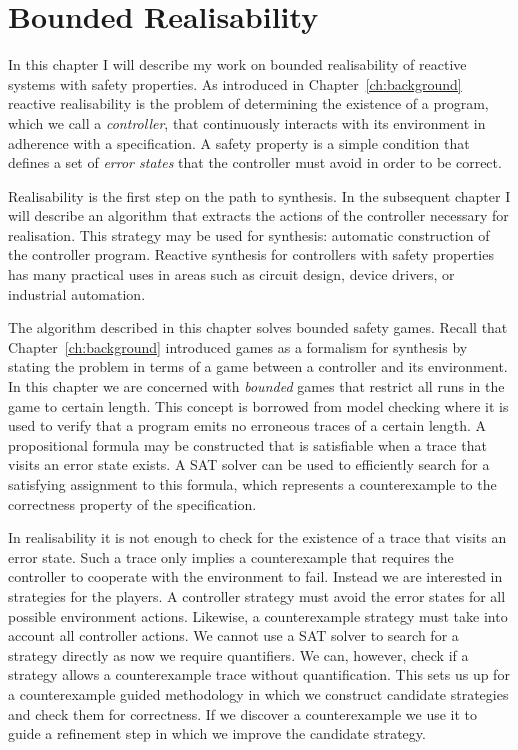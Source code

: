\chapter{Bounded Realisability}
\label{ch:bounded}

\newtheorem*{exmp}{Example}
\newtheorem*{exmpI}{Example: Intuition behind the algorithm}

In this chapter I will describe my work on bounded realisability of reactive systems with safety properties. As introduced in Chapter~\ref{ch:background} reactive realisability is the problem of determining the existence of a program, which we call a \emph{controller}, that continuously interacts with its environment in adherence with a specification. A safety property is a simple condition that defines a set of \emph{error states} that the controller must avoid in order to be correct.

Realisability is the first step on the path to synthesis. In the subsequent chapter I will describe an algorithm that extracts the actions of the controller necessary for realisation. This strategy may be used for synthesis: automatic construction of the controller program. Reactive synthesis for controllers with safety properties has many practical uses in areas such as circuit design, device drivers, or industrial automation.

The algorithm described in this chapter solves bounded safety games. Recall that Chapter~\ref{ch:background} introduced games as a formalism for synthesis by stating the problem in terms of a game between a controller and its environment. In this chapter we are concerned with \emph{bounded} games that restrict all runs in the game to certain length. This concept is borrowed from model checking where it is used to verify that a program emits no erroneous traces of a certain length. A propositional formula may be constructed that is satisfiable when a trace that visits an error state exists. A SAT solver can be used to efficiently search for a satisfying assignment to this formula, which represents a counterexample to the correctness property of the specification. 

In realisability it is not enough to check for the existence of a trace that visits an error state. Such a trace only implies a counterexample that requires the controller to cooperate with the environment to fail. Instead we are interested in strategies for the players. A controller strategy must avoid the error states for all possible environment actions. Likewise, a counterexample strategy must take into account all controller actions. We cannot use a SAT solver to search for a strategy directly as now we require quantifiers. We can, however, check if a strategy allows a counterexample trace without quantification. This sets us up for a counterexample guided methodology in which we construct candidate strategies and check them for correctness. If we discover a counterexample we use it to guide a refinement step in which we improve the candidate strategy.

